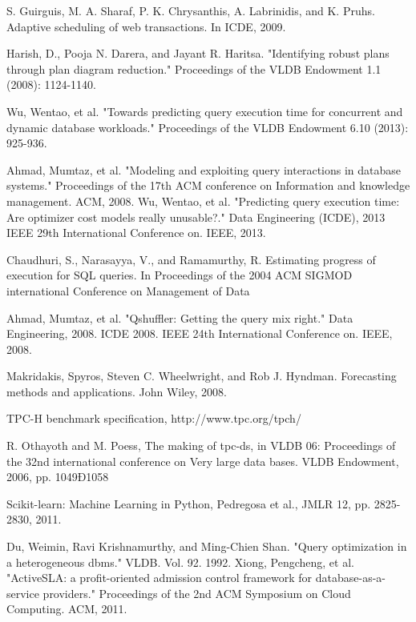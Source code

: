\documentclass{article}
\begin{document}
\begin{multicols}{2}
\begin{thebibliography}{9}
     S. Guirguis, M. A. Sharaf, P. K. Chrysanthis, A. Labrinidis, and
	K. Pruhs. Adaptive scheduling of web transactions. In ICDE, 2009.
	
	Harish, D., Pooja N. Darera, and Jayant R. Haritsa. "Identifying robust plans through plan diagram 			reduction." Proceedings of the VLDB Endowment 1.1 (2008): 1124-1140.
	
	Wu, Wentao, et al. "Towards predicting query execution time for concurrent and dynamic database 			workloads." Proceedings of the VLDB Endowment 6.10 (2013): 925-936.
	
	Ahmad, Mumtaz, et al. "Modeling and exploiting query interactions in database systems." Proceedings of the 17th ACM conference on Information and knowledge management. ACM, 2008.
	Wu, Wentao, et al. "Predicting query execution time: Are optimizer cost models really unusable?." Data Engineering (ICDE), 2013 IEEE 29th International Conference on. IEEE, 2013.
	
	Chaudhuri, S., Narasayya, V., and Ramamurthy, R.
	Estimating progress of execution for SQL queries. In
	Proceedings of the 2004 ACM SIGMOD international
	Conference on Management of Data

	Ahmad, Mumtaz, et al. "Qshuffler: Getting the query mix right." Data Engineering, 2008. ICDE 2008. IEEE 24th International Conference on. IEEE, 2008.	
	
	Makridakis, Spyros, Steven C. Wheelwright, and Rob J. Hyndman. Forecasting methods and applications. John Wiley, 2008.
	
	TPC-H benchmark specification, http://www.tpc.org/tpch/
	
	R. Othayoth and M. Poess, The making of tpc-ds, in VLDB
	06: Proceedings of the 32nd international conference on Very
	large data bases. VLDB Endowment, 2006, pp. 1049Ð1058
	
	Scikit-learn: Machine Learning in Python, Pedregosa et al., JMLR 12, pp. 2825-2830, 2011.
	
	Du, Weimin, Ravi Krishnamurthy, and Ming-Chien Shan. "Query optimization in a heterogeneous dbms." 		VLDB. Vol. 92. 1992.
	Xiong, Pengcheng, et al. "ActiveSLA: a profit-oriented admission control framework for database-as-a-		service providers." Proceedings of the 2nd ACM Symposium on Cloud Computing. ACM, 2011.	
	
	\end{thebibliography}
	\end{multicols}
\end{document}
